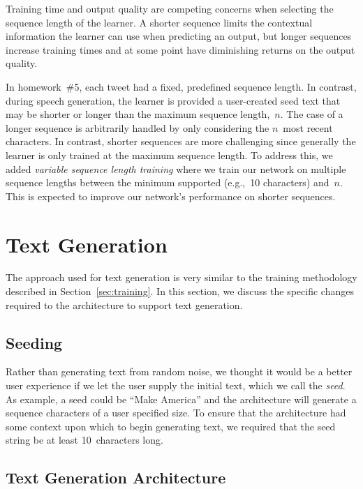 \documentclass{article}
\begin{document}
Training time and output quality are competing concerns when selecting the sequence length of the learner.  A shorter sequence limits the contextual information the learner can use when predicting an output, but longer sequences increase training times and at some point have diminishing returns on the output quality.

In homework~\#5, each tweet had a fixed, predefined sequence length.  In contrast, during speech generation, the learner is provided a user-created seed text that may be shorter or longer than the maximum sequence length,~$n$.  The case of a longer sequence is arbitrarily handled by only considering the $n$~most recent characters.  In contrast, shorter sequences are more challenging since generally the learner is only trained at the maximum sequence length.  To address this, we added \textit{variable sequence length training} where we train our network on multiple sequence lengths between the minimum supported (e.g.,~10 characters) and~$n$.  This is expected to improve our network's performance on shorter sequences.

\section{Text Generation}

The approach used for text generation is very similar to the training methodology described in Section~\ref{sec:training}.  In this section, we discuss the specific changes required to the architecture to support text generation.

\subsection{Seeding}

Rather than generating text from random noise, we thought it would be a better user experience if we let the user supply the initial text, which we call the \textit{seed}.  As example, a seed could be ``Make America'' and the architecture will generate a sequence characters of a user specified size.   To ensure that the architecture had some context upon which to begin generating text, we required that the seed string be at least 10~characters long.

\subsection{Text Generation Architecture}\label{sec:generationRnnArchitecture}
\end{document}
